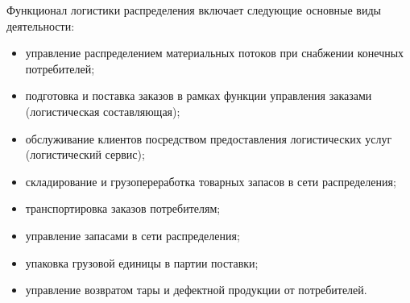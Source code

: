 Функционал логистики распределения включает следующие основные виды деятельности:
\begin{itemize}
	\item управление распределением материальных потоков при снабжении конечных потребителей;
	\item подготовка и поставка заказов в рамках функции управления заказами (логистическая составляющая);
	\item обслуживание клиентов посредством предоставления логистических услуг (логистический сервис);
	\item складирование и грузопереработка товарных запасов в сети распределения;
	\item транспортировка заказов потребителям;
	\item управление запасами в сети распределения;
	\item упаковка грузовой единицы в партии поставки;
	\item управление возвратом тары и дефектной продукции от потребителей.
\end{itemize}



















